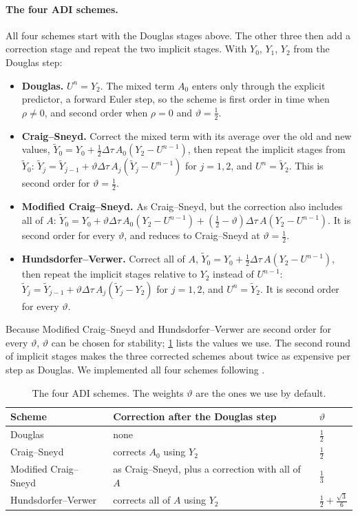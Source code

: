 \documentclass[11pt]{article}
\begin{document}
\paragraph{The four ADI schemes.}
All four schemes start with the Douglas stages above. The other three then add a correction stage and repeat
the two implicit stages. With $Y_0$, $Y_1$, $Y_2$ from the Douglas step:
\begin{itemize}
  \item \textbf{Douglas.} $U^n=Y_2$. The mixed term $A_0$ enters only through the explicit predictor, a
  forward Euler step, so the scheme is first order in time when $\rho\neq0$, and second order when $\rho=0$
  and $\vartheta=\tfrac12$.
  \item \textbf{Craig--Sneyd.} Correct the mixed term with its average over the old and new values,
  $\tilde Y_0 = Y_0 + \tfrac12\Delta\tau\,A_0(Y_2-U^{n-1})$, then repeat the implicit stages from $\tilde Y_0$:
  $\tilde Y_j = \tilde Y_{j-1} + \vartheta\Delta\tau\,A_j(\tilde Y_j-U^{n-1})$ for $j=1,2$, and $U^n=\tilde Y_2$.
  This is second order for $\vartheta=\tfrac12$.
  \item \textbf{Modified Craig--Sneyd.} As Craig--Sneyd, but the correction also includes all of $A$:
  $\tilde Y_0 = Y_0 + \vartheta\Delta\tau\,A_0(Y_2-U^{n-1}) + (\tfrac12-\vartheta)\Delta\tau\,A(Y_2-U^{n-1})$.
  It is second order for every $\vartheta$, and reduces to Craig--Sneyd at $\vartheta=\tfrac12$.
  \item \textbf{Hundsdorfer--Verwer.} Correct all of $A$, $\tilde Y_0 = Y_0 + \tfrac12\Delta\tau\,A(Y_2-U^{n-1})$,
  then repeat the implicit stages relative to $Y_2$ instead of $U^{n-1}$:
  $\tilde Y_j = \tilde Y_{j-1} + \vartheta\Delta\tau\,A_j(\tilde Y_j-Y_2)$ for $j=1,2$, and $U^n=\tilde Y_2$.
  It is second order for every $\vartheta$.
\end{itemize}
Because Modified Craig--Sneyd and Hundsdorfer--Verwer are second order for every $\vartheta$, $\vartheta$ can be chosen for stability;
\cref{tab:schemes} lists the values we use. The second round of implicit stages makes the three corrected schemes about
twice as expensive per step as Douglas. We implemented all four schemes following \cite{inthout2010}.

\begin{table}[ht]
  \centering
  \caption{The four ADI schemes. The weights $\vartheta$ are the ones we use by default.}
  \label{tab:schemes}
  \begin{tabular}{lll}
    \hline
    Scheme & Correction after the Douglas step & $\vartheta$ \\
    \hline
    Douglas & none & $\tfrac12$ \\
    Craig--Sneyd & corrects $A_0$ using $Y_2$ & $\tfrac12$ \\
    Modified Craig--Sneyd & as Craig--Sneyd, plus a correction with all of $A$ & $\tfrac13$ \\
    Hundsdorfer--Verwer & corrects all of $A$ using $Y_2$ & $\tfrac12+\tfrac{\sqrt3}{6}$ \\
    \hline
  \end{tabular}
\end{table}
\end{document}
